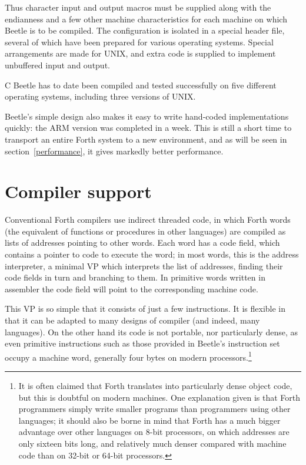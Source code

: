 \documentclass{article}
\begin{document}
Thus character input and output macros must be supplied along with the
endianness and a few other machine characteristics for each machine on which
Beetle is to be compiled. The configuration is isolated in a special header
file, several of which have been prepared for various operating systems.
Special arrangements are made for UNIX, and extra code is supplied to
implement unbuffered input and output.

C Beetle has to date been compiled and tested successfully on five different
operating systems, including three versions of UNIX.

Beetle's simple design also makes it easy to write hand-coded implementations
quickly: the ARM version was completed in a week. This is still a short time
to transport an entire Forth system to a new environment, and as will be seen
in section~\ref{performance}, it gives markedly better performance.


\section{Compiler support}
\label{support}

Conventional Forth compilers use indirect threaded code, in which Forth words
(the equivalent of functions or procedures in other languages) are compiled
as lists of addresses pointing to other words. Each word has a code field,
which contains a pointer to code to execute the word; in most words, this is
the address interpreter, a minimal VP which interprets the list of addresses,
finding their code fields in turn and branching to them. In primitive words
written in assembler the code field will point to the corresponding machine
code.

This VP is so simple that it consists of just a few instructions. It is
flexible in that it can be adapted to many designs of compiler (and indeed,
many languages). On the other hand its code is not portable, nor particularly
dense, as even primitive instructions such as those provided in Beetle's
instruction set occupy a machine word, generally four bytes on modern
processors.\footnote{It is often claimed that Forth translates into
particularly dense object code, but this is doubtful on modern machines. One
explanation given is that Forth programmers simply write smaller programs
than programmers using other languages; it should also be borne in mind that
Forth has a much bigger advantage over other languages on 8-bit processors,
on which addresses are only sixteen bits long, and relatively much denser
compared with machine code than on 32-bit or 64-bit processors.}
\end{document}
